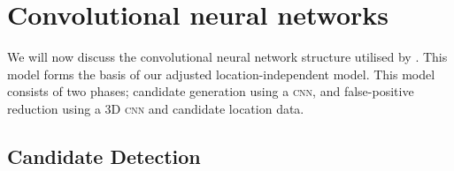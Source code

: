 %
%
%
%
%
%


\section{Convolutional neural networks}\label{litrev-cnn}

We will now discuss the convolutional neural network structure utilised by \cite{GhafoorianM.2017Dml3}. This model forms the basis of our adjusted location-independent model. This model consists of two phases; candidate generation using a \textsc{cnn}, and false-positive reduction using a 3D \textsc{cnn} and candidate location data.

\subsection*{Candidate Detection}


